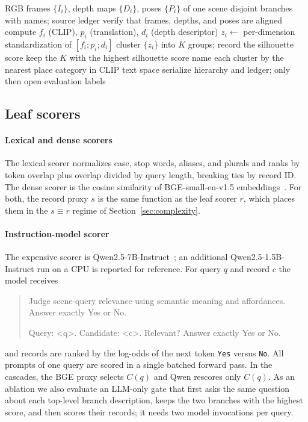 \documentclass{ieeeaccess}
\begin{document}
\begin{algorithm}[!t]
\caption{Raw RGB-D hierarchy construction}
\label{alg:construction}
\small
\begin{algorithmic}[1]
\Require RGB frames $\{I_i\}$, depth maps $\{D_i\}$, poses $\{P_i\}$ of one scene
\Ensure disjoint branches with names; source ledger
\State verify that frames, depths, and poses are aligned
\State compute $f_i$ (CLIP), $p_i$ (translation), $d_i$ (depth descriptor)
\State $z_i\gets$ per-dimension standardization of $[f_i;p_i;d_i]$
 \State cluster $\{z_i\}$ into $K$ groups; record the silhouette score
\EndFor
\State keep the $K$ with the highest silhouette score
\State name each cluster by the nearest place category in CLIP text space
\State serialize hierarchy and ledger; only then open evaluation labels
\end{algorithmic}
\end{algorithm}

\subsection{Leaf scorers}
\label{sec:scorers}
\paragraph{Lexical and dense scorers}
The lexical scorer normalizes case, stop words, aliases, and plurals and ranks by
token overlap plus overlap divided by query length, breaking ties by record ID.
The dense scorer is the cosine similarity of BGE-small-en-v1.5
embeddings~\cite{cpack2024}. For both, the record proxy $s$ is the same function
as the leaf scorer $r$, which places them in the $s\equiv r$ regime of
Section~\ref{sec:complexity}.

\paragraph{Instruction-model scorer}
The expensive scorer is Qwen2.5-7B-Instruct~\cite{qwen25report}; an additional
Qwen2.5-1.5B-Instruct run on a CPU is reported for reference. For query
$q$ and record $c$ the model receives
\begin{quote}\small\ttfamily\raggedright
Judge scene-query relevance using semantic meaning and affordances.
Answer exactly Yes or No.\par
Query: <q>. Candidate: <c>. Relevant? Answer exactly Yes or No.
\end{quote}
and records are ranked by the log-odds of the next token \texttt{Yes} versus
\texttt{No}. All prompts of one query are scored in a single batched forward
pass. In the cascades, the BGE proxy selects $C(q)$ and Qwen rescores only
$C(q)$. As an ablation we also evaluate an LLM-only gate that first asks the same
question about each top-level branch description, keeps the two branches with the
highest score, and then scores their records; it needs two model invocations per
query.
\end{document}
